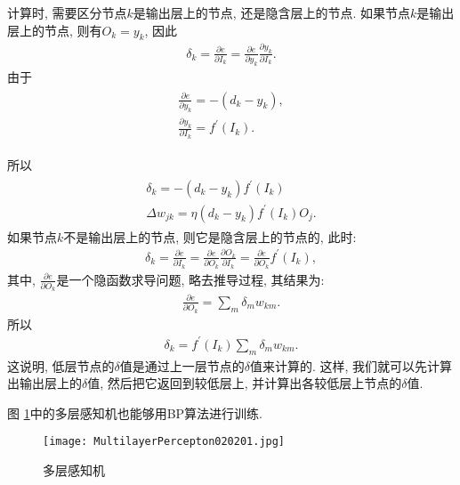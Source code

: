 计算时, 需要区分节点$k$是输出层上的节点, 还是隐含层上的节点. 如果节点$k$是输出层上的节点, 则有$O_k=y_k$, 因此
\begin{align*}
    \delta_{k}=\frac{\partial e}{\partial I_{k}}=\frac{\partial e}{\partial y_{k}} \frac{\partial y_{k}}{\partial I_{k}}.
\end{align*}
由于
\begin{align*}
\begin{array}{l}
    \frac{\partial e}{\partial y_{k}}=-\left (d_{k}-y_{k}\right),\\
    \frac{\partial y_{k}}{\partial I_{k}}=f^{\prime}\left (I_{k}\right).
\end{array}
\end{align*}

所以
\begin{align*}
  \begin{array}{l}{\delta_{k}=-\left (d_{k}-y_{k}\right) f^{\prime}\left (I_{k}\right)} \\
        \Delta w_{j k}=\eta\left (d_{k}-y_{k}\right) f^{\prime}\left (I_{k}\right) O_{j}.
  \end{array}
\end{align*}
如果节点$k$不是输出层上的节点, 则它是隐含层上的节点的, 此时:
\begin{align*}
    \delta_{k}=\frac{\partial e}{\partial I_{k}}=\frac{\partial e}{\partial O_{k}} \frac{\partial O_{k}}{\partial I_{k}}=\frac{\partial e}{\partial O_{k}} f^{\prime}\left (I_{k}\right),
\end{align*}
其中, $\frac{\partial e}{\partial O_{k}}$是一个隐函数求导问题, 略去推导过程, 其结果为:
\begin{align*}
    \frac{\partial e}{\partial O_{k}}=\sum_{m} \delta_{m} w_{k m}.
\end{align*}
所以
\begin{align*}
    \delta_{k}=f^{\prime}\left (I_{k}\right) \sum_{m} \delta_{m} w_{k m}.
\end{align*}
这说明, 低层节点的$\delta$值是通过上一层节点的$\delta$值来计算的. 这样, 我们就可以先计算出输出层上的$\delta$值, 然后把它返回到较低层上, 并计算出各较低层上节点的$\delta$值.

图 \ref{MultilayerPercepton020201}中的多层感知机也能够用BP算法进行训练.
\begin{figure}[H]
\centering
\texttt{[image: MultilayerPercepton020201.jpg]}
\caption{多层感知机}
\label{MultilayerPercepton020201}
\end{figure}
